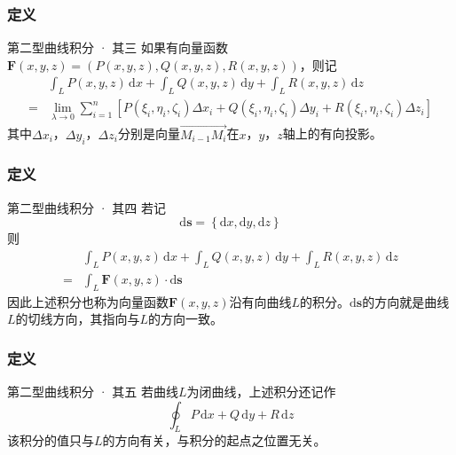\documentclass[xetex]{beamer}
\begin{document}
    \begin{frame}
        \frametitle{定义}
    
        \begin{block}{第二型曲线积分 · 其三}
            如果有\alert{向量函数}$\mathbf{F}(x,y,z)=\left(P(x,y,z),Q(x,y,z),R(x,y,z)\right)$，则记
            $$\begin{aligned}
                & \int_LP(x,y,z)\,\mathrm{d}x+\int_LQ(x,y,z)\,\mathrm{d}y+\int_LR(x,y,z)\,\mathrm{d}z \\
                = & \lim_{\lambda\to 0}\sum_{i=1}^n\left[P(\xi_i,\eta_i,\zeta_i)\Delta x_i+Q(\xi_i,\eta_i,\zeta_i)\Delta y_i+R(\xi_i,\eta_i,\zeta_i)\Delta z_i\right]
            \end{aligned}$$
            其中$\Delta x_i$，$\Delta y_i$，$\Delta z_i$分别是向量$\overrightarrow{M_{i-1}M_i}$在$x$，$y$，$z$轴上的有向投影。
        \end{block}
    
    \end{frame}

    \begin{frame}
        \frametitle{定义}
    
        \begin{block}{第二型曲线积分 · 其四}
            若记$$\mathrm{d}\mathbf{s}=\left\{\mathrm{d}x,\mathrm{d}y,\mathrm{d}z\right\}$$
            则$$\begin{aligned}
                & \int_LP(x,y,z)\,\mathrm{d}x+\int_LQ(x,y,z)\,\mathrm{d}y+\int_LR(x,y,z)\,\mathrm{d}z \\
                = & \int_L\mathbf{F}(x,y,z)\cdot\mathrm{d}\mathbf{s}
            \end{aligned}$$
            因此上述积分也称为向量函数$\mathbf{F}(x,y,z)$\alert{沿有向曲线$L$的积分}。$\mathrm{d}\mathbf{s}$的方向就是曲线$L$的\alert{切线方向}，其指向\alert{与$L$的方向一致}。
        \end{block}
    
    \end{frame}

    \begin{frame}
        \frametitle{定义}
    
        \begin{block}{第二型曲线积分 · 其五}
            若曲线$L$为\alert{闭曲线}，上述积分还记作
            $$\oint_LP\,\mathrm{d}x+Q\,\mathrm{d}y+R\,\mathrm{d}z$$
            该积分的值只与$L$的方向有关，与积分的起点之位置无关。
        \end{block}
    
    \end{frame}
\end{document}
